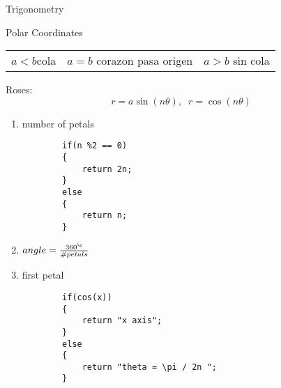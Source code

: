 \begin{section}{Trigonometry}
\begin{subsection}{Polar Coordinates}
		\begin{tabular}{ |m{5cm}|m{5cm}|m{5cm}|  }
		\hline
			$a<b$\newline cola &     $a = b$ \newline corazon pasa origen &       $a > b$ \newline sin cola
		\end{tabular}

		\newpage
 		Roses:
		$$ r = a \sin (n \theta ) , \; \; r = \cos ( n \theta ) $$
		\begin{enumerate}
			\item number of petals
	\begin{verbatim}
		if(n %2 == 0)
		{
			return 2n;
		}
		else
		{
			return n;
		}
	\end{verbatim}
			\item 
				$angle = \frac{360^{\o}}{\# petals} $ 
			\item 
				first petal
	\begin{verbatim}
		if(cos(x))
		{
			return "x axis";
		}
		else
		{
			return "theta = \pi / 2n ";
		}
	\end{verbatim}
		\end{enumerate}

	\end{subsection}

	\end{section}




